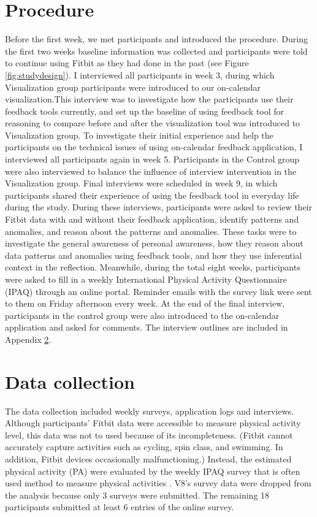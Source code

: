 \documentclass[12pt,oneside]{book}
\begin{document}
\section {Procedure}
Before the first week, we met participants and introduced the procedure. During the first two weeks baseline information was collected and participants were told to continue using Fitbit as they had done in the past (see Figure \ref{fig:studydesign}). I interviewed all participants in week 3, during which Visualization group participants were introduced to our on-calendar visualization.This interview was to investigate how the participants use their feedback tools currently, and set up the baseline of using feedback tool for reasoning to compare before and after the visualization tool was introduced to Visualization group. 
To investigate their initial experience and help the participants on the technical issues of using on-calendar feedback application, I interviewed all participants again in week 5. Participants in the Control group were also interviewed to balance the influence of interview intervention in the Visualization group.
 Final interviews were scheduled in week 9, in which participants shared their experience of using the feedback tool in everyday life during the study. 
 During these interviews, participants were asked to review their Fitbit data with and without their feedback application, identify patterns and anomalies, and reason about the patterns and anomalies. These tasks were to investigate the general awareness of personal awareness, how they reason about data patterns and anomalies using feedback tools, and how they use inferential context in the reflection. 
 Meanwhile, during the total eight weeks, participants were asked to fill in a weekly International Physical Activity Questionnaire (IPAQ) \cite{ipaq} through an online portal. Reminder emails with the survey link were sent to them on Friday afternoon every week. At the end of the final interview, participants in the control group were also introduced to the on-calendar application and asked for comments. The interview outlines are included in Appendix \ref{}.



\section{Data collection}
The data collection included weekly surveys, application logs and interviews. Although participants’ Fitbit data were accessible to measure physical activity level, this data was not to used  because of its incompleteness. (Fitbit cannot accurately capture activities such as cycling, spin class, and swimming.  In addition, Fitbit devices occasionally malfunctioning.)  Instead, the estimated physical activity (PA) were evaluated by the weekly IPAQ survey that is often used method to measure physical activities \cite{ahtinen_user_2009, consolvo_design_2006, biernat_assessment_2008,harrison_activity_2015,charbonneau_teach_2011,du_efficacy_2014}.  V8's survey data were dropped from the analysis because only 3 surveys were submitted. The remaining 18 participants submitted at least 6 entries of the online survey. 
\end{document}
